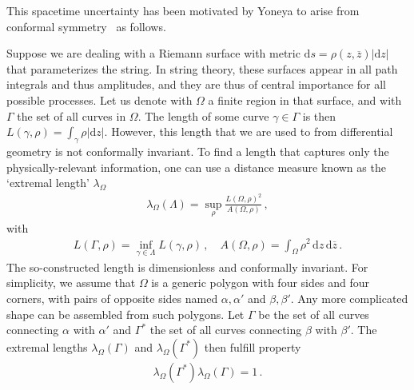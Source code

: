 \documentclass{article}
\def\beqn{\begin{eqnarray}}
\def\eeqn{\end{eqnarray}}
\begin{document}
This spacetime uncertainty has been motivated by Yoneya to arise from conformal symmetry~\cite{Yoneya:1989ai,Yoneya:2000bt} as follows.

Suppose we are dealing with a Riemann surface with metric $\mathrm{d}s = \rho(z,\overline z) |\mathrm{d}z|$ that
parameterizes the string. In string theory, these surfaces appear in all path integrals and thus 
amplitudes, and they are thus of central importance for all possible processes. Let us denote with $\Omega$ a
finite region in that surface, and with $\Gamma$ the set of all curves in $\Omega$. The length of some
curve $\gamma \in \Gamma$ is then $L(\gamma, \rho) = \int_\gamma \rho |\mathrm{d}z|$. However, this length that
we are used to from differential geometry is not conformally invariant. To find a length that captures only 
the physically-relevant information, one can use a distance measure known as the `extremal length' $\lambda_{\Omega}$ 
\beqn
\lambda_\Omega(\Lambda) = \sup_\rho \frac{L(\Omega,\rho)^2}{A(\Omega, \rho)} \,,
\eeqn 
with
\beqn
L(\Gamma,\rho) = \inf_{\gamma \in \Lambda} L(\gamma,\rho) \,,\quad
A(\Omega,\rho) = \int_\Omega \rho^2 \, \mathrm{d}z \, \mathrm{d}\overline{z} \,.
\eeqn
The so-constructed length is dimensionless and conformally invariant. For simplicity, we assume that $\Omega$ is a generic polygon 
with four sides and four corners, with pairs of opposite sides named $\alpha,\alpha'$ and $\beta,\beta'$. Any more complicated
shape can be assembled from such polygons. Let 
$\Gamma$ be the set of all curves connecting $\alpha$ with $\alpha'$ and $\Gamma^*$ the set of all curves
connecting $\beta$ with $\beta'$. The extremal lengths $\lambda_\Omega(\Gamma)$ and $\lambda_\Omega(\Gamma^*)$ then
fulfill property~\cite{Yoneya:1989ai,Yoneya:2000bt}
\beqn
\lambda_\Omega(\Gamma^*) \lambda_\Omega(\Gamma) = 1 \,.
\eeqn
\end{document}
